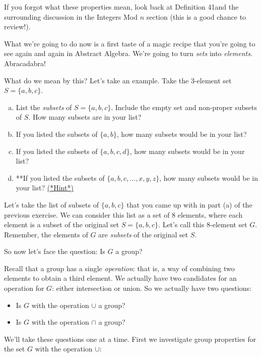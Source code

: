 \noindent
If you forgot what these properties mean, look back at Definition 41and the surrounding discussion in the Integers Mod $n$ section (this is a good chance to review!).

What we're going to do now is a first taste of a magic recipe that you're going to see again and again in Abstract Algebra. We're going to turn \emph{sets} into \emph{elements}. Abracadabra!

What do we mean by this? Let's take an example. Take the 3-element set $S = \{a,b,c\}$. 

\begin{exercise}\label{exercise:sets:31}
\begin{enumerate}[(a)]
\item
List the \emph{subsets} of $S =  \{a,b,c\}$. Include the empty set and non-proper subsets of $S$. How many subsets are in your list?
\item
If you listed the subsets of $\{a,b\}$, how many subsets would be in your list?
\item
If you listed the subsets of $\{a,b,c,d\}$, how many subsets would be in your list?
\item
**If you listed the subsets of $\{a,b,c,\ldots,x,y,z\}$, how many subsets would be in your list?
\hyperref[sec:set_chapter:hints]{(*Hint*)}
\end{enumerate}
\end{exercise}

Let's take the list of subsets of $\{a,b,c\}$ that you came up with in part (a) of the previous exercise. We can consider this list as a set of 8 elements, where each element is a subset of the original set $S = \{a,b,c\}$. Let's call this 8-element set $G$. Remember, the elements of $G$ are \emph{subsets} of the original set $S$.

So now let's face the question:  Is $G$ a group? 

Recall that a group has a single \emph{operation}: that is, a way of combining two elements to obtain a third element. We actually have two candidates for an operation for $G$: either intersection or union. So we actually have two questions:
\begin{itemize}
\item
 Is $G$ with the operation $\cup$ a group?
\item
Is $G$ with the operation $\cap$ a group?
\end{itemize}

We'll take these questions one at a time. First we investigate group properties for the set $G$ with the operation $\cup$:


